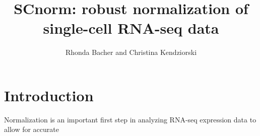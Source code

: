 \documentclass{article}\usepackage[]{graphicx}\usepackage[usenames,dvipsnames]{color}
\begin{document}
\title{SCnorm: robust normalization of
    single-cell RNA-seq data}
\author{Rhonda Bacher and Christina Kendziorski}
\maketitle
\tableofcontents
\setcounter{tocdepth}{2}

\section{Introduction}
\label{sec:intro}
Normalization is an important first step in analyzing RNA-seq expression data to allow for accurate 
% 
% 
% 
% 
% 
% 
% 
% 
\end{document}
